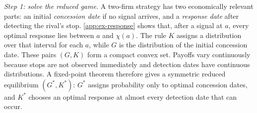 \documentclass[12pt,reqno]{article}
\theoremstyle{definition} \newtheorem{example}{Example}
\theoremstyle{definition} \newtheorem{condition}{Condition}
\theoremstyle{definition} \newtheorem{corollary}{Corollary}
\theoremstyle{definition} \newtheorem{claim}{Claim}
\theoremstyle{definition} \newtheorem{definition}{Definition}
\theoremstyle{definition} \newtheorem{conjecture}{Conjecture}
\theoremstyle{definition} \newtheorem{Lemma}{Lemma}
\theoremstyle{definition} \newtheorem{lemma}{Lemma}
\theoremstyle{plain} \newtheorem{theorem}{Theorem}
\theoremstyle{definition} \newtheorem{assumption}{Assumption}
\theoremstyle{definition} \newtheorem*{assumptionnonumber}{Assumption}
\theoremstyle{definition} \newtheorem*{theoremNoNumber}{Proposition}
\theoremstyle{definition}
\theoremstyle{definition}\newtheorem{proposition}{Proposition}
\theoremstyle{definition} \newtheorem{result}{Result}
\theoremstyle{definition} \newtheorem*{definitionNoNumber}{Definition}
\theoremstyle{definition} \newtheorem{Definition}{Definition}
\theoremstyle{definition} \newtheorem*{DefinitionNoNumber}{Definition}
\theoremstyle{definition} \newtheorem*{fact}{Fact}
\theoremstyle{definition} \newtheorem*{property}{Property}
\theoremstyle{definition} \newtheorem{remark}{Remark}
\begin{document}
\emph{Step 1: solve the reduced game.} A two-firm strategy has two economically relevant parts: an initial \emph{concession date} if no signal arrives, and a \emph{response date} after detecting the rival's stop. \cref{app:ex-response} shows that, after a signal at $a$, every optimal response lies between $a$ and $\chi(a)$. The rule $K$ assigns a distribution over that interval for each $a$, while $G$ is the distribution of the initial concession date. These pairs $(G,K)$ form a compact convex set. Payoffs vary continuously because stops are not observed immediately and detection dates have continuous distributions. A fixed-point theorem therefore gives a symmetric reduced equilibrium $(G^\ast,K^\ast)$: $G^\ast$ assigns probability only to optimal concession dates, and $K^\ast$ chooses an optimal response at almost every detection date that can occur.
\end{document}
